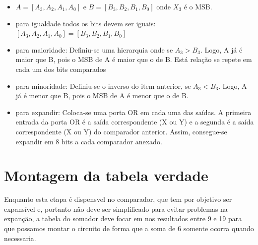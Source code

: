 \documentclass[11pt]{report}         %
\begin{document}
\begin {itemize}
\begin{itemize}
\begin {itemize}
\item $A = [A_3, A_2, A_1, A_0]$ e $B = [B_3, B_2, B_1, B_0]$ onde $X_3$ é o MSB.

\item para igualdade todos os bits devem ser iguais: $[A_3, A_2, A_1, A_0] = [B_3, B_2, B_1, B_0]$

\item para maioridade: Definiu-se uma hierarquia onde se $A_3 > B_3$. Logo, A já é maior que B, pois o MSB de A é maior que o de B. Está relação se repete 
em cada um dos bits comparados

\item para minoridade: Definiu-se o inverso do item anterior, se $A_3 < B_3$. Logo, A já é menor que B, pois o MSB de A é menor que o de B.

\item para expandir: Coloca-se uma porta OR em cada uma das saídas. A primeira entrada da porta OR é a saída correspondente (X ou Y) e a segunda 
é a saída correspondente (X ou Y) do comparador anterior. Assim, consegue-se expandir em 8 bits a cada comparador anexado.

\end {itemize} 
\end {itemize}
\end {itemize}

\section {Montagem da tabela verdade}

Enquanto esta etapa é dispensvel no comparador, que tem por objetivo ser expansível e, portanto não deve ser simplificado para evitar problemas 
na expanção, a tabela do somador deve focar em nos resultados entre 9 e 19 para que possamos montar o circuito de forma que a soma de 6 somente ocorra 
quando necessaria.
\end{document}
